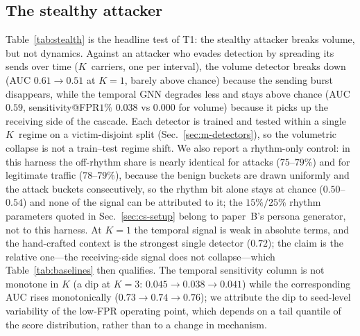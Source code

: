 \subsection{The stealthy attacker}
\label{sec:res-stealth}
Table~\ref{tab:stealth} is the headline test of T1: the stealthy attacker breaks volume, but not dynamics.
Against an attacker who evades detection by spreading its sends over time ($K$~carriers, one per interval),
the volume detector breaks down (AUC $0.61\!\to\!0.51$ at $K{=}1$, barely above chance) because the sending
burst disappears, while the temporal GNN degrades less and stays above chance (AUC $0.59$,
sensitivity@FPR$1\%$ $0.038$ vs $0.000$ for volume) because it picks up the receiving side of the cascade.
Each detector is trained and tested within a single $K$~regime on a victim-disjoint split (Sec.~\ref{sec:m-detectors}),
so the volumetric collapse is not a train--test regime shift. We also report a rhythm-only control: in this
harness the off-rhythm share is nearly identical for attacks ($75$--$79\%$) and for legitimate traffic
($78$--$79\%$), because the benign buckets are drawn uniformly and the attack buckets consecutively, so the
rhythm bit alone stays at chance ($0.50$--$0.54$) and none of the signal can be attributed to it; the
$15\%/25\%$ rhythm parameters quoted in Sec.~\ref{sec:cs-setup} belong to paper~B's persona generator, not
to this harness. At $K{=}1$ the temporal signal is weak in absolute terms, and the hand-crafted context is
the strongest single detector ($0.72$); the claim is the relative one---the receiving-side signal does not
collapse---which Table~\ref{tab:baselines} then qualifies. The temporal sensitivity
column is not monotone in $K$ (a dip at $K{=}3$: $0.045 \to 0.038 \to 0.041$) while the corresponding AUC rises monotonically
($0.73 \to 0.74 \to 0.76$); we attribute the dip to seed-level variability of the low-FPR operating point,
which depends on a tail quantile of the score distribution, rather than to a change in mechanism.

